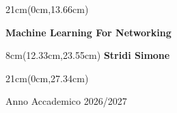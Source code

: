\begin{titlepage}
\begin{textblock*}{21cm}(0cm,13.66cm)
	\fontsize{20}{24}\selectfont
	\centerline  {\textbf{Machine Learning For Networking}}
\end{textblock*}


\fontsize{14}{17}\selectfont

\begin{textblock*}{8cm}(12.33cm,23.55cm)
	\noindent	\textbf{Stridi Simone}
\end{textblock*}


\begin{textblock*}{21cm}(0cm,27.34cm)
	\centerline{Anno Accademico 2026/2027}
\end{textblock*}

\end{titlepage}